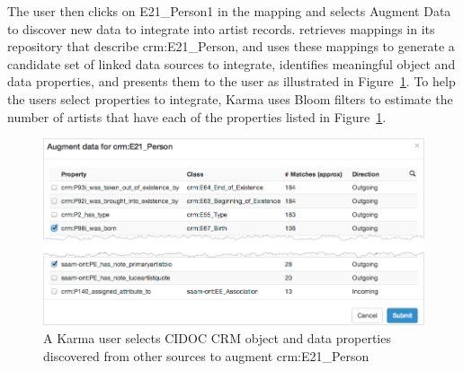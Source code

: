 The user then clicks on  E21\_Person1 in the \rtworml mapping and selects Augment Data to discover new data to integrate into artist records.  
\karma retrieves \rtworml mappings in its repository that describe crm:E21\_Person, and uses these mappings to generate a candidate set of linked data sources to integrate, identifies meaningful object and data properties, and presents them to the user as illustrated in Figure~\ref{fig:search-screenshot}.
To help the users select properties to integrate, Karma uses Bloom filters to estimate the number of artists that have each of the properties listed in Figure~\ref{fig:search-screenshot}.
\begin{figure}[t]
\centering
\includegraphics[width=4.9in]{images/5-search.png}
\vspace{-5mm}
\caption{A Karma user selects CIDOC CRM object and data properties discovered from other sources to augment crm:E21\_Person}
\vspace{-15pt}
\label{fig:search-screenshot}
\end{figure}